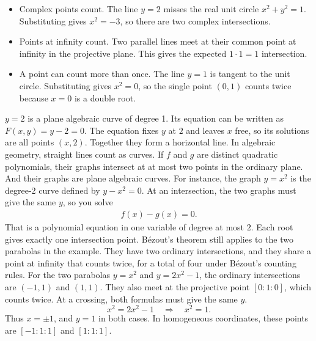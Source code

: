 \documentclass{report}
\begin{document}
\begin{itemize}
            \begin{itemize}
                \item Complex points count. The line \(y=2\) misses the real unit circle \(x^2+y^2=1\). Substituting gives \(x^2=-3\), so there are two complex intersections.
                \item Points at infinity count. Two parallel lines meet at their common point at infinity in the projective plane. This gives the expected \(1\cdot 1=1\) intersection.
                \item A point can count more than once. The line \(y=1\) is tangent to the unit circle. Substituting gives \(x^2=0\), so the single point \((0,1)\) counts twice because \(x=0\) is a double root.
            \end{itemize}
            \(y=2\) is a plane algebraic curve of degree 1. Its equation can be written as \(F(x,y)=y-2=0\).
            \bigbreak \noindent 
            The equation fixes \(y\) at \(2\) and leaves \(x\) free, so its solutions are all points \((x,2)\). Together they form a horizontal line. In algebraic geometry, straight lines count as curves.
            \bigbreak \noindent 
            If \(f\) and \(g\) are distinct quadratic polynomials, their graphs intersect at at most two points in the ordinary plane. And their graphs are plane algebraic curves. For instance, the graph \(y=x^2\) is the degree-2 curve defined by \(y-x^2=0\).
            \bigbreak \noindent 
            At an intersection, the two graphs must give the same $y$, so you solve 
            \begin{align*}
                f(x) - g(x) = 0
            .\end{align*}
            That is a polynomial equation in one variable of degree at most \(2\). Each root gives exactly one intersection point.
            \bigbreak \noindent 
            Bézout’s theorem still applies to the two parabolas in the example. They have two ordinary intersections, and they share a point at infinity that counts twice, for a total of four under Bézout’s counting rules.
            \bigbreak \noindent 
            For the two parabolas \(y=x^2\) and \(y=2x^2-1\), the ordinary intersections are \((-1,1)\) and \((1,1)\). They also meet at the projective point \([0:1:0]\), which counts twice.
            \bigbreak \noindent 
            At a crossing, both formulas must give the same \(y\).
            \[
                x^2=2x^2-1
                \quad\Longrightarrow\quad
                x^2=1.
            \]
            Thus \(x=\pm1\), and \(y=1\) in both cases. In homogeneous coordinates, these points are \([-1:1:1]\) and \([1:1:1]\).

\end{itemize}
\end{document}
